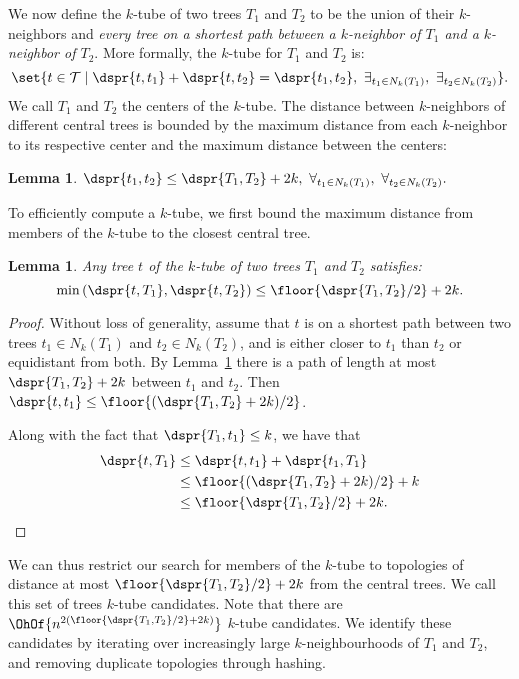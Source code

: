\documentclass{amsart}
\newtheorem{lemma}[theorem]{Lemma}
\newcommand{\TT}{\mathcal T}
\begin{document}
We now define the $k$-tube of two trees $T_1$ and $T_2$ to be the union of their $k$-neighbors and \emph{every tree on a shortest path between a $k$-neighbor of $T_1$ and a $k$-neighbor of $T_2$}.
More formally, the $k$-tube for $T_1$ and $T_2$ is:
\[ \set{t \in \TT \mid \dspr{t, t_1} + \dspr{t, t_2} = \dspr{t_1, t_2},\ \exists_{t_1 \in N_k(T_1)},\ \exists_{t_2 \in N_k(T_2)} } .\]
We call $T_1$ and $T_2$ the centers of the $k$-tube.
The distance between $k$-neighbors of different central trees is bounded by the maximum distance from each $k$-neighbor to its respective center and the maximum distance between the centers:

\begin{lemma}
	\label{lem:neighbor_distance}
	$\dspr{t_1, t_2} \le \dspr{T_1, T_2} + 2k,\ \forall_{t_1 \in N_k(T_1)},\ \forall_{t_2 \in N_k(T_2)}.$
\end{lemma}

To efficiently compute a $k$-tube, we first bound the maximum distance from members of the $k$-tube to the closest central tree.
\begin{lemma}
	\label{lem:k_tube_distance}
	Any tree $t$ of the $k$-tube of two trees $T_1$ and $T_2$ satisfies:
	\[ \min\left({\dspr{t, T_1}, \dspr{t, T_2}}\right) \le \floor{\dspr{T_1, T_2}/2} + 2k .\]
\end{lemma}
\begin{proof}
Without loss of generality, assume that $t$ is on a shortest path between two trees $t_1 \in N_k(T_1)$ and $t_2 \in N_k(T_2)$, and is either closer to $t_1$ than $t_2$ or equidistant from both.
By Lemma~\ref{lem:neighbor_distance} there is a path of length at most $\dspr{T_1, T_2} + 2k$ between $t_1$ and $t_2$.
Then $\dspr{t, t_1} \le \floor{(\dspr{T_1, T_2} + 2k) / 2}$.

Along with the fact that $\dspr{T_1, t_1} \le k$, we have that
\begin{align*}
\dspr{t, T_1} &\le \dspr{t, t_1} + \dspr{t_1, T_1} \\
&\le \floor{(\dspr{T_1, T_2} + 2k) / 2} + k \\
&\le \floor{\dspr{T_1, T_2} / 2} + 2k.
\end{align*}

\end{proof}
We can thus restrict our search for members of the $k$-tube to topologies of distance at most $\floor{\dspr{T_1, T_2}/2} + 2k$ from the central trees.
We call this set of trees $k$-tube candidates.
Note that there are $\OhOf{n^{2(\floor{\dspr{T_1, T_2}/2} + 2k)}}$ $k$-tube candidates.
We identify these candidates by iterating over increasingly large $k$-neighbourhoods of $T_1$ and $T_2$, and removing duplicate topologies through hashing.  
\end{document}
